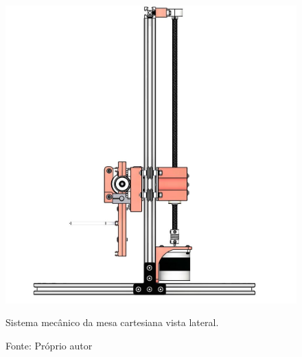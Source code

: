 \begin{figure}[H]
\centering
\includegraphics[scale = 0.25]{figuras/mesacartesianalateral}
\caption{Sistema mecânico da mesa cartesiana vista lateral.}
\caption*{Fonte: Próprio autor}
\label{fig:mesacartesianalateral}
\end{figure}
        
